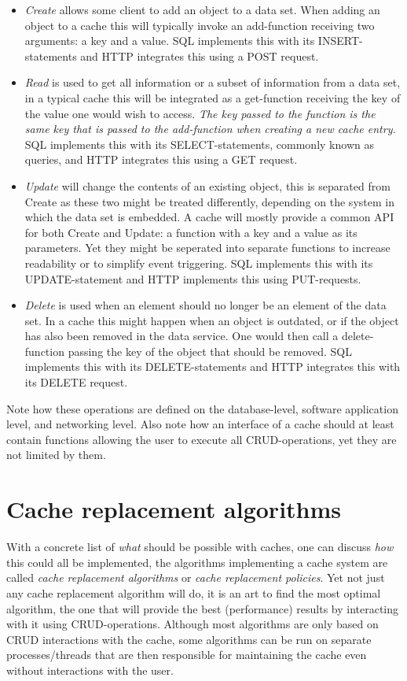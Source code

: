 \documentclass[pdftex,a4paper,12pt,twoside]{report}
\begin{document}
\begin{itemize}
\item \emph{Create} allows some client to add an object to a data set. When adding an object to a cache this will typically invoke an add-function receiving two arguments: a key and a value. SQL implements this with its INSERT-statements and HTTP integrates this using a POST request.
\item \emph{Read} is used to get all information or a subset of information from a data set, in a typical cache this will be integrated as a get-function receiving
the key of the value one would wish to access. \emph{The key passed to the function is the same key that is passed to the add-function when creating a new cache entry.} SQL implements this with its SELECT-statements, commonly known as queries, and HTTP integrates this using a GET request.
\item \emph{Update} will change the contents of an existing object, this is separated from Create as these two might be treated differently, depending on the system in which the data set is embedded. A cache will mostly provide a common API for both Create and Update: a function with a key and a value as its parameters. Yet they might be seperated into separate functions to increase readability or to simplify event triggering. SQL implements this with its UPDATE-statement and HTTP implements this using PUT-requests.
\item \emph{Delete} is used when an element should no longer be an element of the data set. In a cache this might happen when an object is outdated, or if the object has also been removed in the data service. One would then call a delete-function passing the key of the object that should be removed. SQL implements this with its DELETE-statements and HTTP integrates this with its DELETE request.
\end{itemize}
\citep{battle2008bridging} Note how these operations are defined on the database-level, software application level, and networking level. Also note how an interface of a cache should at least contain functions allowing the user to execute all CRUD-operations, yet they are not limited by them.
\chapter{Cache replacement algorithms}
\label{chap:caching_algorithms}
With a concrete list of \emph{what} should be possible with caches, one can discuss \emph{how} this could all be implemented, the algorithms implementing a cache system are called \emph{cache replacement algorithms} or \emph{cache replacement policies}. Yet not just any cache replacement algorithm will do, it is an art to find the most optimal algorithm, the one that will provide the best (performance) results by interacting with it using CRUD-operations.
Although most algorithms are only based on CRUD interactions with the cache, some algorithms can be run on separate processes/threads that are
then responsible for maintaining the cache even without interactions with the user.
\end{document}
